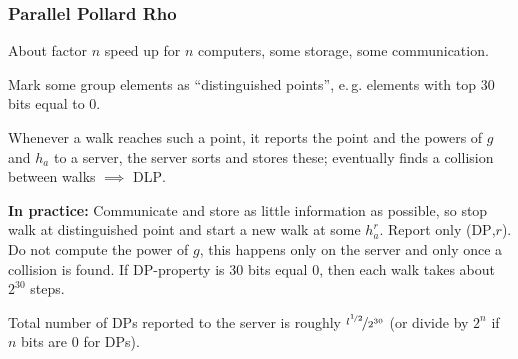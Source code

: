 \subsubsection{Parallel Pollard Rho}

About factor $n$ speed up for $n$ computers, some storage, some communication.

Mark some group elements as ``distinguished points'', e.\,g. elements with top $30$ bits equal to $0$.

Whenever a walk reaches such a point, it reports the point and the powers of $g$ and $h_a$ to a server, the server sorts and stores these; eventually finds a collision between walks $\implies$ \textsc{DLP}.

\textbf{In practice:} Communicate and store as little information as possible, so stop walk at distinguished point and start a new walk at some $h_a^r$. Report only (\textsc{DP},$r$). Do not compute the power of $g$, this happens only on the server and only once a collision is found. If \textsc{DP}-property is $30$ bits equal $0$, then each walk takes about $2^{30}$ steps.

Total number of \textsc{DP}s reported to the server is roughly $\nicefrac{l^{\nicefrac{1}{2}}}{2^{30}}$ (or divide by $2^n$ if $n$ bits are $0$ for \textsc{DP}s).